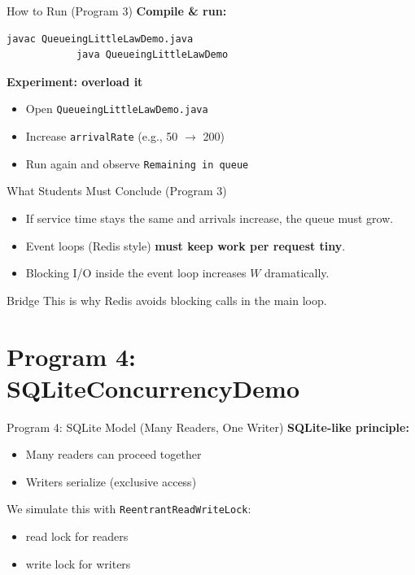 \documentclass[11pt]{beamer}
\begin{document}
	\begin{frame}[fragile]{How to Run (Program 3)}
		\textbf{Compile \& run:}
		\begin{lstlisting}[language=bash]
			javac QueueingLittleLawDemo.java
			java QueueingLittleLawDemo
		\end{lstlisting}

		
		\textbf{Experiment: overload it}
		\begin{itemize}
			\item Open \texttt{QueueingLittleLawDemo.java}
			\item Increase \texttt{arrivalRate} (e.g., 50 $\rightarrow$ 200)
			\item Run again and observe \texttt{Remaining in queue}
		\end{itemize}
	\end{frame}
	
	\begin{frame}{What Students Must Conclude (Program 3)}
		\begin{itemize}
			\item If service time stays the same and arrivals increase, the queue must grow.
			\item Event loops (Redis style) \textbf{must keep work per request tiny}.
			\item Blocking I/O inside the event loop increases $W$ dramatically.
		\end{itemize}

		
		\begin{block}{Bridge}
			This is why Redis avoids blocking calls in the main loop.
		\end{block}
	\end{frame}
	
	\section{Program 4: SQLiteConcurrencyDemo}
	
	\begin{frame}{Program 4: SQLite Model (Many Readers, One Writer)}
		\textbf{SQLite-like principle:}
		\begin{itemize}
			\item Many readers can proceed together
			\item Writers serialize (exclusive access)
		\end{itemize}

		
		We simulate this with \texttt{ReentrantReadWriteLock}:
		\begin{itemize}
			\item read lock for readers
			\item write lock for writers
		\end{itemize}
	\end{frame}
	
\end{document}
